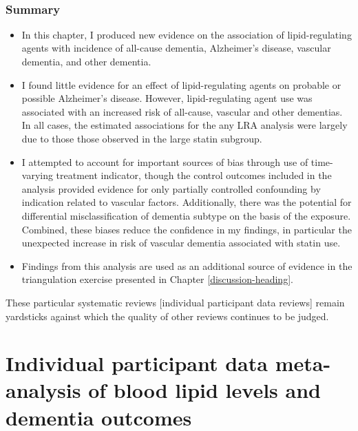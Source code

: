 \documentclass[a4paper, twoside]{templates/ociamthesis}
\begin{document}
~

\hypertarget{summary-4}{%
\subsection{Summary}\label{summary-4}}

\begin{itemize}
\item
  In this chapter, I produced new evidence on the association of lipid-regulating agents with incidence of all-cause dementia, Alzheimer's disease, vascular dementia, and other dementia.
\item
  I found little evidence for an effect of lipid-regulating agents on probable or possible Alzheimer's disease. However, lipid-regulating agent use was associated with an increased risk of all-cause, vascular and other dementias. In all cases, the estimated associations for the any LRA analysis were largely due to those those observed in the large statin subgroup.
\item
  I attempted to account for important sources of bias through use of time-varying treatment indicator, though the control outcomes included in the analysis provided evidence for only partially controlled confounding by indication related to vascular factors. Additionally, there was the potential for differential misclassification of dementia subtype on the basis of the exposure. Combined, these biases reduce the confidence in my findings, in particular the unexpected increase in risk of vascular dementia associated with statin use.
\item
  Findings from this analysis are used as an additional source of evidence in the triangulation exercise presented in Chapter \ref{discussion-heading}.
\end{itemize}

\begin{savequote}
These particular systematic reviews {[}individual participant data
reviews{]} remain yardsticks against which the quality of other reviews
continues to be judged.
\end{savequote}



\hypertarget{ipd-heading}{%
\chapter{Individual participant data meta-analysis of blood lipid levels and dementia outcomes}\label{ipd-heading}}
\end{document}
